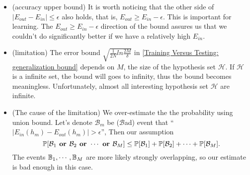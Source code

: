 \begin{itemize}[noitemsep, topsep=0pt]
    \item (accuracy upper bound) It is worth noticing that the other side of $|E_{out} - E_{in}| \le \epsilon$ also holds,
        that is, $E_{out} \ge E_{in} - \epsilon$.
        This is important for learning. 
        The $E_{out} \ge E_{in} - \epsilon$ direction of the bound assures us that we couldn't do significantly better
        if we have a relatively high $E_{in}$.
    \item (limitation) The error bound $\sqrt{\frac{1}{2N} ln \frac{2M}{\delta}}$ in \ref{Training Versus Testing: generalization bound}
        depends on $M$, the size of the hypothesis set $\mathcal{H}$. 
        If $\mathcal{H}$ is a infinite set,
        the bound will goes to infinity,
        thus the bound becomes meaningless.
        Unfortunately, almost all interesting hypothesis set $\mathcal{H}$ are infinite.
    \item (The cause of the limitation) We over-estimate the the probability using union bound. 
        Let's denote $\mathcal{B}_m$ be ($\mathcal{B}$ad) event that ``$|E_{in}(h_m) - E_{out}(h_m)| > \epsilon$'',
        Then our assumption
        \begin{equation}
            \mathbb{P}[\mathcal{B}_1 \textbf{ or } \mathcal{B}_2 \textbf{ or } \cdots \textbf{ or }\mathcal{B}_M]
            \le \mathbb{P}[\mathcal{B}_1] + \mathbb{P}[\mathcal{B}_2] + \cdots + \mathbb{P}[\mathcal{B}_M].
        \end{equation}
        The events $\mathbb{B}_1, \cdots, \mathbb{B}_M$ are more likely strongly overlapping,
        so our estimate is bad enough in this case.
\end{itemize}









